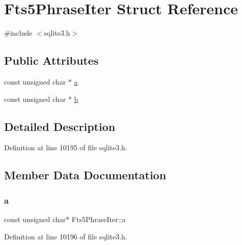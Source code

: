 \hypertarget{struct_fts5_phrase_iter}{}\section{Fts5\+Phrase\+Iter Struct Reference}
\label{struct_fts5_phrase_iter}


{\ttfamily \#include $<$sqlite3.\+h$>$}

\subsection*{Public Attributes}
\begin{DoxyCompactItemize}
\item 
const unsigned char $\ast$ \mbox{\hyperlink{struct_fts5_phrase_iter_a335969d1ac0fcbb94173c472a3f179ae}{a}}
\item 
const unsigned char $\ast$ \mbox{\hyperlink{struct_fts5_phrase_iter_a459180b0d670604aa38b3ac94be6adda}{b}}
\end{DoxyCompactItemize}


\subsection{Detailed Description}


Definition at line 10195 of file sqlite3.\+h.



\subsection{Member Data Documentation}
\mbox{\label{struct_fts5_phrase_iter_a335969d1ac0fcbb94173c472a3f179ae}} 
\subsubsection{\texorpdfstring{a}{a}}
{\footnotesize\ttfamily const unsigned char$\ast$ Fts5\+Phrase\+Iter\+::a}



Definition at line 10196 of file sqlite3.\+h.

\mbox{\label{struct_fts5_phrase_iter_a459180b0d670604aa38b3ac94be6adda}} 
